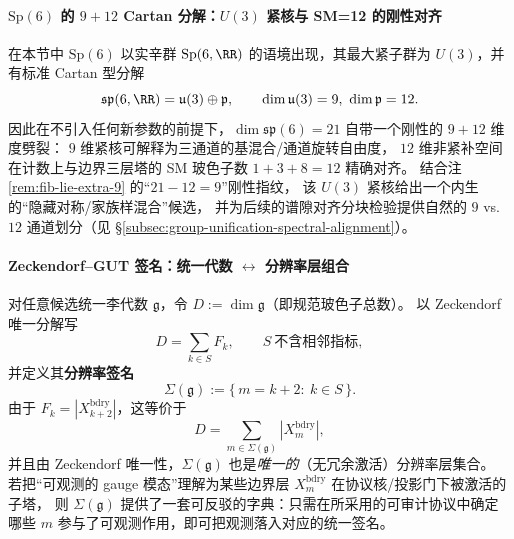 \paragraph{\texorpdfstring{$\mathrm{Sp}(6)$}{Sp(6)} 的 $9+12$ Cartan 分解：\texorpdfstring{$U(3)$}{U(3)} 紧核与 SM=12 的刚性对齐}
在本节中 \(\mathrm{Sp}(6)\) 以实辛群 \(\mathrm{Sp}(6,\RR)\) 的语境出现，其最大紧子群为 \(U(3)\)，并有标准 Cartan 型分解
\[
\mathfrak{sp}(6,\RR)=\mathfrak{u}(3)\oplus \mathfrak{p},\qquad \dim\mathfrak{u}(3)=9,\ \dim\mathfrak{p}=12.
\]
因此在不引入任何新参数的前提下，\(\dim\mathfrak{sp}(6)=21\) 自带一个刚性的 \(9+12\) 维度劈裂：
\(9\) 维紧核可解释为三通道的基混合/通道旋转自由度，
\(12\) 维非紧补空间在计数上与边界三层塔的 SM 玻色子数 \(1+3+8=12\) 精确对齐。
结合注 \ref{rem:fib-lie-extra-9} 的“\(21-12=9\)”刚性指纹，
该 \(U(3)\) 紧核给出一个内生的“隐藏对称/家族样混合”候选，
并为后续的谱隙对齐分块检验提供自然的 \(9\) vs.\ \(12\) 通道划分（见 \S\ref{subsec:group-unification-spectral-alignment}）。

\paragraph{Zeckendorf--GUT 签名：统一代数 \texorpdfstring{$\leftrightarrow$}{<->} 分辨率层组合}
对任意候选统一李代数 \(\mathfrak g\)，令 \(D:=\dim\mathfrak g\)（即规范玻色子总数）。
以 Zeckendorf 唯一分解写
\[
D=\sum_{k\in S}F_k,\qquad S\ \text{不含相邻指标},
\]
并定义其\textbf{分辨率签名}
\[
\Sigma(\mathfrak g):=\{\,m=k+2:\ k\in S\,\}.
\]
由于 \(F_k=|X^{\mathrm{bdry}}_{k+2}|\)，这等价于
\[
D=\sum_{m\in\Sigma(\mathfrak g)}|X_m^{\mathrm{bdry}}|,
\]
并且由 Zeckendorf 唯一性，\(\Sigma(\mathfrak g)\) 也是\emph{唯一的}（无冗余激活）分辨率层集合。
若把“可观测的 gauge 模态”理解为某些边界层 \(X_m^{\mathrm{bdry}}\) 在协议核/投影门下被激活的子塔，
则 \(\Sigma(\mathfrak g)\) 提供了一套可反驳的字典：只需在所采用的可审计协议中确定哪些 \(m\) 参与了可观测作用，即可把观测落入对应的统一签名。



